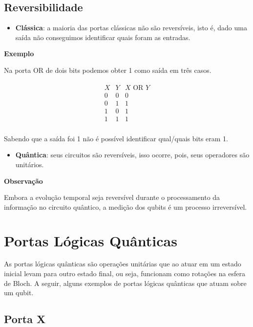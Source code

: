 \subsection{Reversibilidade}\label{subsec:reversibilidade}

\begin{itemize}
\tightlist
\item
  \textbf{Clássica}: a maioria das portas clássicas não são reversíveis,
  isto é, dado uma saída não conseguimos identificar quais foram as
  entradas.
\end{itemize}

\textbf{Exemplo}

Na porta OR de dois bits podemos obter 1 como saída em três casos.

\[\begin{aligned}
\begin{array}{cc|c}
    X & Y & X \text{ OR } Y \\
    0 & 0 & 0 \\
    0 & 1 & 1 \\
    1 & 0 & 1 \\
    1 & 1 & 1 \\
\end{array}
\end{aligned}\]

Sabendo que a saída foi 1 não é possível identificar qual/quais bits
eram 1.

\begin{itemize}
\tightlist
\item
  \textbf{Quântica}: seus circuitos são reversíveis, isso ocorre, pois,
  seus operadores são unitários.
\end{itemize}

\textbf{Observação}

Embora a evolução temporal seja reversível durante o processamento da
informação no circuito quântico, a medição dos qubits é um processo
irreversível.

\section{Portas Lógicas Quânticas}\label{sec:portas-quanticas}

As portas lógicas quânticas são operações {unitárias} que ao atuar em um
estado inicial levam para outro estado final, ou seja, funcionam como
rotações na esfera de Bloch.
A seguir, alguns exemplos de portas lógicas quânticas que atuam sobre um qubit.

\subsection{Porta X}\label{subsec:porta-x}

